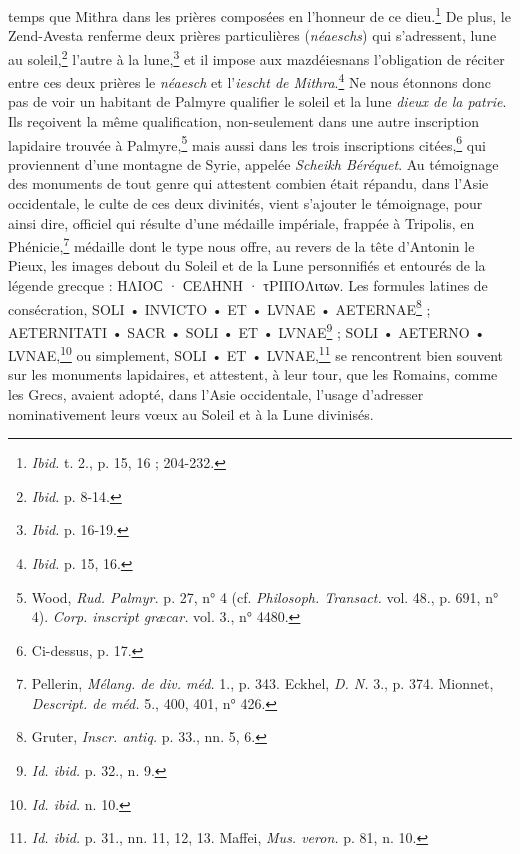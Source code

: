 \documentclass{article}
\begin{document}
temps que Mithra dans les prières composées en l'honneur de ce dieu.\footnote{\emph{Ibid.} t. 2., p. 15, 16 ; 204-232.} De plus, le Zend-Avesta renferme deux prières particulières (\emph{néaeschs}) qui s'adressent, lune au soleil,\footnote{\emph{Ibid.} p. 8-14.} l'autre à la lune,\footnote{\emph{Ibid.} p. 16-19.} et il impose aux mazdéiesnans l'obligation de réciter entre ces deux prières le \emph{néaesch} et l'\emph{iescht de Mithra}.\footnote{\emph{Ibid.} p. 15, 16.} Ne nous étonnons donc pas de voir un habitant de Palmyre qualifier le soleil et la lune \emph{dieux de la patrie}. Ils reçoivent la même qualification, non-seulement dans une autre inscription lapidaire trouvée à Palmyre,\footnote{Wood, \emph{Rud. Palmyr.} p. 27, n° 4 (cf. \emph{Philosoph. Transact.} vol. 48., p. 691, n° 4). \emph{Corp. inscript græcar.} vol. 3., n° 4480.} mais aussi dans les trois inscriptions citées,\footnote{Ci-dessus, p. 17.} qui proviennent d'une montagne de Syrie, appelée \emph{Scheikh Béréquet}. Au témoignage des monuments de tout genre qui attestent combien était répandu, dans l'Asie occidentale, le culte de ces deux divinités, vient s'ajouter le témoignage, pour ainsi dire, officiel qui résulte d'une médaille impériale, frappée à Tripolis, en Phénicie,\footnote{Pellerin, \emph{Mélang. de div. méd.} 1., p. 343. Eckhel, \emph{D. N.} 3., p. 374. Mionnet, \emph{Descript. de méd.} 5., 400, 401, n° 426.} médaille dont le type nous offre, au revers de la tête d'Antonin le Pieux, les images debout du Soleil et de la Lune personnifiés et entourés de la légende grecque : \textgreek{ΗΛΙΟϹ · ϹΕΛΗΝΗ · τΡΙΠΟΛιτων}. Les formules latines de consécration, SOLI • INVICTO • ET • LVNAE • AETERNAE\footnote{Gruter, \emph{Inscr. antiq.} p. 33., nn. 5, 6.} ; AETERNITATI • SACR • SOLI • ET • LVNAE\footnote{\emph{Id. ibid.} p. 32., n. 9.} ; SOLI • AETERNO • LVNAE,\footnote{\emph{Id. ibid.} n. 10.} ou simplement, SOLI • ET • LVNAE,\footnote{\emph{Id. ibid.} p. 31., nn. 11, 12, 13. Maffei, \emph{Mus. veron.} p. 81, n. 10.} se rencontrent bien souvent sur les monuments lapidaires, et attestent, à leur tour, que les Romains, comme les Grecs, avaient adopté, dans l'Asie occidentale, l'usage d'adresser nominativement leurs vœux au Soleil et à la Lune divinisés.
\end{document}

